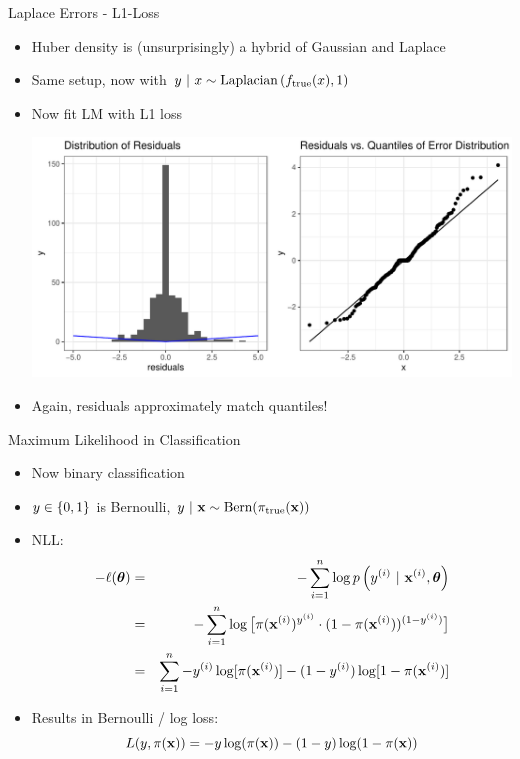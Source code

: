 \documentclass[11pt,compress,t,notes=noshow, xcolor=table]{beamer}
\begin{document}
\begin{vbframe}{Laplace Errors - L1-Loss}
\begin{itemize}
\item Huber density is (unsurprisingly) a hybrid of Gaussian and Laplace

\end{itemize}

\framebreak 

\begin{itemize}
	\item Same setup, now with $y ~|~x \sim \text{Laplacian}\left(f_{\text{true}}(x), 1\right)$ 
\item Now fit LM with L1 loss

\vfill

\includegraphics{figure/residuals_plot_L1.pdf}


\item Again, residuals approximately match quantiles!


\end{itemize}


\end{vbframe}



\begin{vbframe}{Maximum Likelihood in Classification}


\begin{itemize}

\item Now binary classification
\item $y \in \{0, 1\}$ is Bernoulli, $y ~|~ \mathbf{x} \sim \text{Bern}(\pi_\text{true}(\mathbf{x}))$
\item  NLL:
\begin{eqnarray*}
- \ell(\bm{\theta}) &=& -\sum\limits_{i=1}^n \log p\left(y^{(i)} ~|~\mathbf{x}^{(i)}, \bm{\theta}\right) \\ 
&=& - \sum\limits_{i=1}^n \log \big[\pi(\mathbf{x}^{(i)})^{y^{(i)}} \cdot (1 - \pi(\mathbf{x}^{(i)}))^{(1 - y^{(i)})} \big]\\
&=& \sum\limits_{i=1}^n -y^{(i)} \log[\pi(\mathbf{x}^{(i)})] - (1-y^{(i)}) \log [1 - \pi(\mathbf{x}^{(i)})]
\end{eqnarray*}
\item Results in Bernoulli / log loss:
$$
  L(y, \pi(\mathbf{x})) = -y\log(\pi(\mathbf{x}))-(1-y)\log(1-\pi(\mathbf{x}))
$$


\end{itemize}

\end{vbframe}
\end{document}
